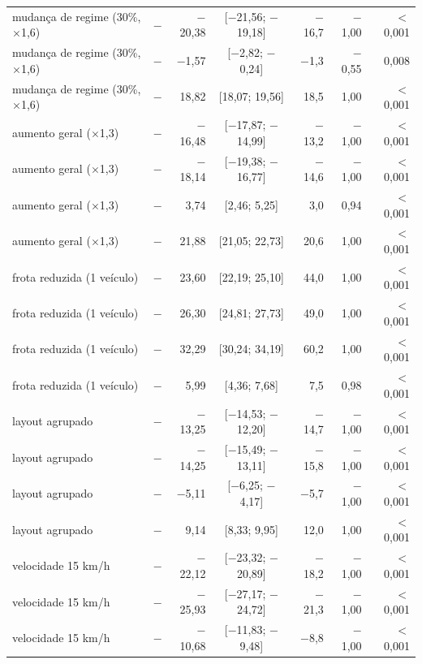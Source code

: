 \begin{tabular}{@{}llrcrrr@{}}
mudança de regime (30\%, $\times$1,6) & \polC{} $-$ \polA{} & $-$20,38 & [$-$21,56; $-$19,18] & $-$16,7 & $-$1,00 & $<$0,001 \\
mudança de regime (30\%, $\times$1,6) & \polD{} $-$ \polA{} & $-$1,57 & [$-$2,82; $-$0,24] & $-$1,3 & $-$0,55 & 0,008 \\
mudança de regime (30\%, $\times$1,6) & \polD{} $-$ \polC{} & 18,82 & [18,07; 19,56] & 18,5 & 1,00 & $<$0,001 \\
aumento geral ($\times$1,3) & \polBOR{} $-$ \polA{} & $-$16,48 & [$-$17,87; $-$14,99] & $-$13,2 & $-$1,00 & $<$0,001 \\
aumento geral ($\times$1,3) & \polC{} $-$ \polA{} & $-$18,14 & [$-$19,38; $-$16,77] & $-$14,6 & $-$1,00 & $<$0,001 \\
aumento geral ($\times$1,3) & \polD{} $-$ \polA{} & 3,74 & [2,46; 5,25] & 3,0 & 0,94 & $<$0,001 \\
aumento geral ($\times$1,3) & \polD{} $-$ \polC{} & 21,88 & [21,05; 22,73] & 20,6 & 1,00 & $<$0,001 \\
frota reduzida (1 veículo) & \polBOR{} $-$ \polA{} & 23,60 & [22,19; 25,10] & 44,0 & 1,00 & $<$0,001 \\
frota reduzida (1 veículo) & \polC{} $-$ \polA{} & 26,30 & [24,81; 27,73] & 49,0 & 1,00 & $<$0,001 \\
frota reduzida (1 veículo) & \polD{} $-$ \polA{} & 32,29 & [30,24; 34,19] & 60,2 & 1,00 & $<$0,001 \\
frota reduzida (1 veículo) & \polD{} $-$ \polC{} & 5,99 & [4,36; 7,68] & 7,5 & 0,98 & $<$0,001 \\
layout agrupado & \polBOR{} $-$ \polA{} & $-$13,25 & [$-$14,53; $-$12,20] & $-$14,7 & $-$1,00 & $<$0,001 \\
layout agrupado & \polC{} $-$ \polA{} & $-$14,25 & [$-$15,49; $-$13,11] & $-$15,8 & $-$1,00 & $<$0,001 \\
layout agrupado & \polD{} $-$ \polA{} & $-$5,11 & [$-$6,25; $-$4,17] & $-$5,7 & $-$1,00 & $<$0,001 \\
layout agrupado & \polD{} $-$ \polC{} & 9,14 & [8,33; 9,95] & 12,0 & 1,00 & $<$0,001 \\
velocidade 15 km/h & \polBOR{} $-$ \polA{} & $-$22,12 & [$-$23,32; $-$20,89] & $-$18,2 & $-$1,00 & $<$0,001 \\
velocidade 15 km/h & \polC{} $-$ \polA{} & $-$25,93 & [$-$27,17; $-$24,72] & $-$21,3 & $-$1,00 & $<$0,001 \\
velocidade 15 km/h & \polD{} $-$ \polA{} & $-$10,68 & [$-$11,83; $-$9,48] & $-$8,8 & $-$1,00 & $<$0,001 \\

\end{tabular}
